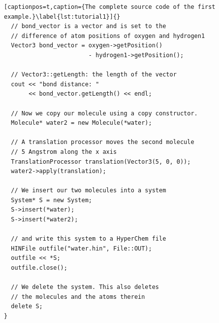 \begin{lstlisting}[captionpos=t,caption={The complete source code of the first example.}\label{lst:tutorial1}]{}
  // bond_vector is a vector and is set to the
  // difference of atom positions of oxygen and hydrogen1
  Vector3 bond_vector = oxygen->getPosition() 
                        - hydrogen1->getPosition();

  // Vector3::getLength: the length of the vector
  cout << "bond distance: " 
       << bond_vector.getLength() << endl;

  // Now we copy our molecule using a copy constructor.
  Molecule* water2 = new Molecule(*water);

  // A translation processor moves the second molecule
  // 5 Angstrom along the x axis
  TranslationProcessor translation(Vector3(5, 0, 0));
  water2->apply(translation);

  // We insert our two molecules into a system
  System* S = new System;
  S->insert(*water);
  S->insert(*water2);

  // and write this system to a HyperChem file
  HINFile outfile("water.hin", File::OUT);
  outfile << *S;
  outfile.close();

  // We delete the system. This also deletes 
  // the molecules and the atoms therein
  delete S;
}
\end{lstlisting}
